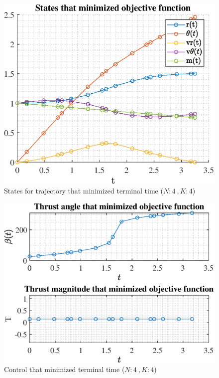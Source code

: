 \documentclass[]{article}
\begin{document}
\begin{figure}
	\centering
	\includegraphics[scale=0.75]{states_N4_K4_C2_tf.eps}
	\caption{States for trajectory that minimized terminal time (\(N:4\ , K:4\))}
	\label{fig:states_N4_K4_C2_tf}
\end{figure}
\begin{figure}
	\centering
	\includegraphics[scale=0.75]{control_N4_K4_C2_tf.eps}
	\caption{Control that minimized terminal time (\(N:4\ , K:4\))}
	\label{fig:control_N4_K4_C2_tf}
\end{figure}
\end{document}
